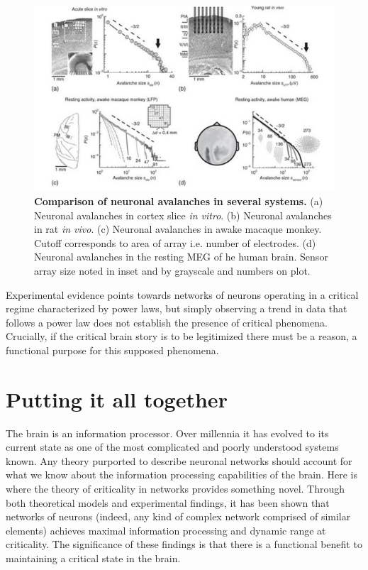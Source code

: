 \documentclass[12pt]{article}
\begin{document}
\begin{figure}      
  \begin{center}    
 \includegraphics[width=.70\textwidth]{avalanchesplenzbook}    
    \caption{\textbf{Comparison of neuronal avalanches in several systems.} (a) Neuronal avalanches in cortex slice \textit{in vitro}. (b) Neuronal avalanches in rat \textit{in vivo}. (c) Neuronal avalanches in awake macaque monkey. Cutoff corresponds to area of array i.e. number of electrodes. (d) Neuronal avalanches in the resting MEG of he human brain. Sensor array size noted in inset and by grayscale and numbers on plot. \cite{Plenz2014}}
   \label{Figure::Neuronal avalanches in vitro and in vivo}   
  \end{center}     
   \end{figure}

Experimental evidence points towards networks of neurons operating in a critical regime characterized by power laws, but simply observing a trend in data that follows a power law does not establish the presence of critical phenomena. Crucially, if the critical brain story is to be legitimized there must be a reason, a functional purpose for this supposed phenomena.   
      
\section*{Putting it all together}

The brain is an information processor. Over millennia it has evolved to its current state as one of the most complicated and poorly understood systems known. Any theory purported to describe neuronal networks should account for what we know about the information processing capabilities of the brain. Here is where the theory of criticality in networks provides something novel. Through both theoretical models and experimental findings, it has been shown that networks of neurons (indeed, any kind of complex network comprised of similar elements) achieves maximal information processing and dynamic range at criticality. The significance of these findings is that there is a functional benefit to maintaining a critical state in the brain.
\end{document}
